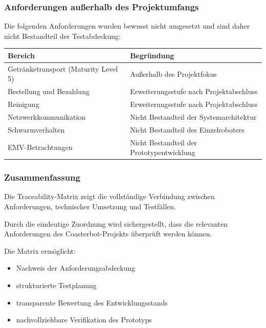 \subsubsection{Anforderungen außerhalb des
Projektumfangs}\label{anforderungen-auuxdferhalb-des-projektumfangs}

Die folgenden Anforderungen wurden bewusst nicht umgesetzt und sind
daher nicht Bestandteil der Testabdeckung:

\begin{longtable}[]{@{}
  >{\raggedright\arraybackslash}p{}
  >{\raggedright\arraybackslash}p{}@{}}
\toprule\noalign{}
\begin{minipage}[b]{\linewidth}\raggedright
Bereich
\end{minipage} & \begin{minipage}[b]{\linewidth}\raggedright
Begründung
\end{minipage} \\
\midrule\noalign{}
\endhead
\bottomrule\noalign{}
\endlastfoot
Getränketransport (Maturity Level 5) & Außerhalb des Projektfokus \\
Bestellung und Bezahlung & Erweiterungsstufe nach Projektabschluss \\
Reinigung & Erweiterungsstufe nach Projektabschluss \\
Netzwerkkommunikation & Nicht Bestandteil der Systemarchitektur \\
Schwarmverhalten & Nicht Bestandteil des Einzelroboters \\
EMV-Betrachtungen & Nicht Bestandteil der Prototypentwicklung \\
\end{longtable}

\subsubsection{Zusammenfassung}\label{zusammenfassung-6}

Die Traceability-Matrix zeigt die vollständige Verbindung zwischen
Anforderungen, technischer Umsetzung und Testfällen.

Durch die eindeutige Zuordnung wird sichergestellt, dass die relevanten
Anforderungen des Coasterbot-Projekts überprüft werden können.

Die Matrix ermöglicht:

\begin{itemize}
\tightlist
\item
  Nachweis der Anforderungsabdeckung
\item
  strukturierte Testplanung
\item
  transparente Bewertung des Entwicklungsstands
\item
  nachvollziehbare Verifikation des Prototyps
\end{itemize}

